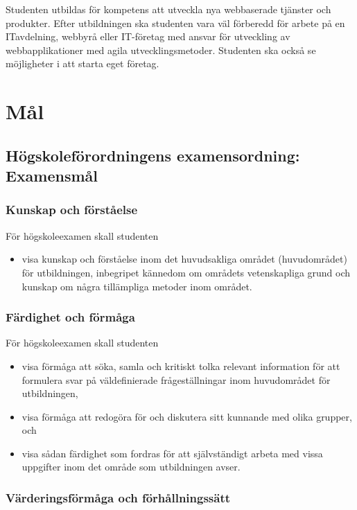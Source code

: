 \documentclass[swedish]{LnuCmThesis}
\begin{document}
Studenten utbildas för kompetens att utveckla nya webbaserade tjänster och produkter.
Efter utbildningen ska studenten vara väl förberedd för arbete på en IT­avdelning,
webbyrå eller IT-­företag med ansvar för utveckling av webbapplikationer med agila
utvecklingsmetoder. Studenten ska också se möjligheter i att starta eget företag.

\section*{Mål}

\subsection*{Högskoleförordningens examensordning: Examensmål}

\subsubsection*{Kunskap och förståelse}

För högskoleexamen skall studenten

\begin{itemize}
    \item visa kunskap och förståelse inom det huvudsakliga området (huvudområdet) för utbildningen, inbegripet kännedom om områdets vetenskapliga grund och kunskap om några tillämpliga metoder inom området.
\end{itemize}

\subsubsection*{Färdighet och förmåga}

För högskoleexamen skall studenten

\begin{itemize}
    \item visa förmåga att söka, samla och kritiskt tolka relevant information för att formulera svar på väldefinierade frågeställningar inom huvudområdet för utbildningen,
    \item visa förmåga att redogöra för och diskutera sitt kunnande med olika grupper, och
    \item visa sådan färdighet som fordras för att självständigt arbeta med vissa uppgifter inom det område som utbildningen avser.
\end{itemize}

\subsubsection*{Värderingsförmåga och förhållningssätt}
\end{document}
